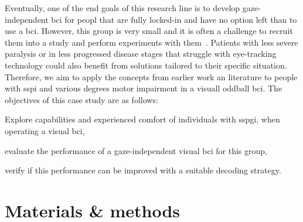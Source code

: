 Eventually, one of the end goals of this research line is to develop
gaze-independent \ac{bci} for peopl that are fully locked-in and have no option left than to use a \ac{bci}.
However, this group is very small and it is often a challenge to recruit them
into a study and perform experiments with them~\cite{Wolpaw2006}.
Patients with less severe paralysis or in less progressed disease stages that struggle with
eye-tracking technology could also benefit from
solutions tailored to their specific situation.
Therefore, we aim to apply the concepts from earlier work an literature to
people with \ac{sspi} and various degrees motor impairment in a visuall oddball
\ac{bci}.
The objectives of this case study are as follows:
\begin{enumerate*}
  \item Explore capabilities and experienced comfort of individuals with
    \ac{sspgi}, when operating a visual \ac{bci},
  \item evaluate the performance of a gaze-independent visual \ac{bci} for this
    group,
  \item verify if this performance can be improved with a suitable decoding
    strategy.
\end{enumerate*}


\section{Materials \& methods}

